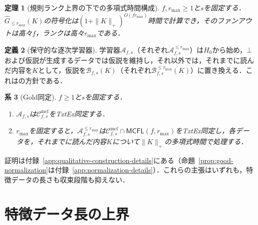 \documentclass[11pt,a4paper]{ltjsarticle}
\numberwithin{equation}{section}
\theoremstyle{plain}
\newtheorem{theorem}{定理}[section]
\newtheorem{corollary}[theorem]{系}
\theoremstyle{definition}
\newtheorem{definition}[theorem]{定義}
\theoremstyle{remark}
\newcommand{\Cmcf}[2]{\mathcal{C}^{\mathrm{mcf}}_{#1,#2}}
\newcommand{\pausesym}{\bot}
\begin{document}
\begin{theorem}[規則ランク上界の下での多項式時間構成]
\label{thm:poly}
$f,r_{\max}\ge1$と$s$を固定する．$\widehat G_{\le r_{\max}}(K)$の符号化は$(1+\|K\|_+)^{O(fr_{\max})}$時間で計算でき，そのファンアウトは高々$f$，ランクは高々$r_{\max}$である．
\end{theorem}

\begin{definition}[保守的な逐次学習器]
\label{def:conservative-learner}
学習器$\mathcal A_{f,s}$（それぞれ$\mathcal A_{f,s}^{\le r_{\max}}$）は$H_0$から始め，$\pausesym$および仮説が生成するデータでは仮説を維持し，それ以外では，それまでに読んだ内容を$K$として，仮説を$\mathcal B_{f,s}(K)$（それぞれ$\mathcal B_{f,s}^{\le r_{\max}}(K)$）に置き換える．これは\cite[Algorithm~1]{Yoshinaka2011}の方針である．
\end{definition}

\begin{corollary}[Gold同定]
\label{cor:gold-explanatory}
\label{cor:capped-gold-poly}
$f\ge1$と$s$を固定する．
\begin{enumerate}[label=\textup{(\roman*)}]
\item $\mathcal A_{f,s}$は$\Cmcf{f}{s}$をTxtEx同定する．
\item $r_{\max}$を固定すると，$\mathcal A_{f,s}^{\le r_{\max}}$は$\Cmcf{f}{s}\cap\mathsf{MCFL}(f,r_{\max})$をTxtEx同定し，各データを，それまでに読んだ内容$K$について$\|K\|_+$の多項式時間で処理する．
\end{enumerate}
\end{corollary}

証明は付録~\ref{app:qualitative-construction-details}にある（命題~\ref{prop:good-normalization}は付録~\ref{app:normalization-details}）．これらの主張はいずれも，特徴データの長さも収束段階も抑えない．

\section{特徴データ長の上界}
\label{sec:char-data}
\end{document}
